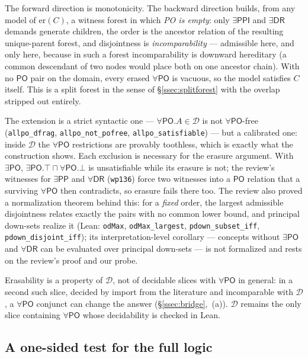 \documentclass[11pt]{article}
\newcommand{\DR}{\mathsf{DR}}
\newcommand{\PO}{\mathsf{PO}}
\newcommand{\PP}{\mathsf{PP}}
\newcommand{\PPI}{\mathsf{PPI}}
\newcommand{\code}[1]{\texttt{#1}}
\theoremstyle{plain}
\theoremstyle{definition}
\begin{document}
The forward direction is monotonicity. The backward direction builds, from any
model of $\mathrm{er}(C)$, a witness forest in which \emph{PO is empty}: only
$\exists\PPI$ and $\exists\DR$ demands generate children, the order is the
ancestor relation of the resulting unique-parent forest, and disjointness is
\emph{incomparability} --- admissible here, and only here, because in such a
forest incomparability is downward hereditary (a common descendant of two
nodes would place both on one ancestor chain). With no $\PO$ pair on the
domain, every erased $\forall\PO$ is vacuous, so the model satisfies $C$
itself. This is a split forest in the sense of \S\ref{ssec:splitforest} with
the overlap stripped out entirely.

The extension is a strict syntactic one --- $\forall\PO.A\in\mathcal D$ is not
$\forall\PO$-free (\code{allpo\_dfrag}, \code{allpo\_not\_pofree},
\code{allpo\_satisfiable}) --- but a calibrated one: inside $\mathcal D$ the
$\forall\PO$ restrictions are provably toothless, which is exactly what the
construction shows. Each exclusion is necessary for the erasure argument. With
$\exists\PO$,
$\exists\PO.\top\sqcap\forall\PO.\bot$ is unsatisfiable while its erasure is
not; the review's witnesses for $\exists\PP$ and $\forall\DR$
(\texttt{wp136}) force two witnesses into a $\PO$ relation that a surviving
$\forall\PO$ then contradicts, so erasure fails there too. The review also
proved a normalization theorem behind this: for a \emph{fixed} order, the
largest admissible disjointness relates exactly the pairs with no common
lower bound, and principal down-sets realize it (Lean: \code{odMax},
\code{odMax\_largest}, \code{pdown\_subset\_iff},
\code{pdown\_disjoint\_iff}); its interpretation-level corollary --- concepts
without $\exists\PO$ and $\forall\DR$ can be evaluated over principal
down-sets --- is not formalized and rests on the review's proof and our probe.

Erasability is a property of $\mathcal D$, not of decidable slices with
$\forall\PO$ in general: in a second such slice, decided by import from the
literature and incomparable with $\mathcal D$, a $\forall\PO$ conjunct can
change the answer (\S\ref{ssec:bridge},~(a)). $\mathcal D$ remains the only
slice containing $\forall\PO$ whose decidability is checked in Lean.

\subsection{A one-sided test for the full logic}
\label{ssec:full}
\end{document}
